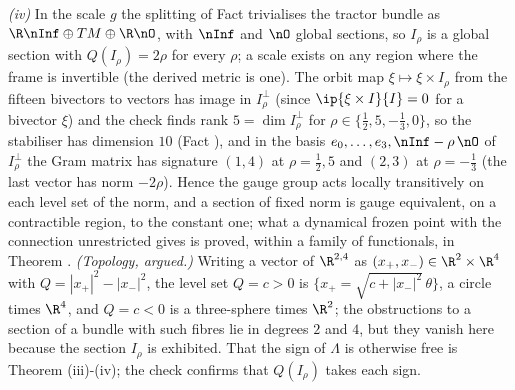 \emph{(iv)} In the scale $g$ the splitting of Fact  trivialises the tractor bundle as $\R\nInf \oplus TM \oplus \R\nO$, with $\nInf$ and $\nO$ global sections, so $I_{\rho}$ is a global section with $Q(I_{\rho}) = 2\rho$ for every $\rho$; a scale exists on any region where the frame is invertible (the derived metric is one). The orbit map $\xi \mapsto \xi \times I_{\rho}$ from the fifteen bivectors to vectors has image in $I_{\rho}^{\perp}$ (since $\ip{\xi \times I}{I} = 0$ for a bivector $\xi$) and the check finds rank $5 = \dim I_{\rho}^{\perp}$ for $\rho \in \{\tfrac12, 5, -\tfrac13, 0\}$, so the stabiliser has dimension $10$ (Fact ), and in the basis $e_{0}, \ldots, e_{3}, \nInf - \rho\,\nO$ of $I_{\rho}^{\perp}$ the Gram matrix has signature $(1,4)$ at $\rho = \tfrac12, 5$ and $(2,3)$ at $\rho = -\tfrac13$ (the last vector has norm $-2\rho$). Hence the gauge group acts locally transitively on each level set of the norm, and a section of fixed norm is gauge equivalent, on a contractible region, to the constant one; what a dynamical frozen point with the connection unrestricted gives is proved, within a family of functionals, in Theorem . \emph{(Topology, argued.)} Writing a vector of $\R^{2,4}$ as $(x_{+}, x_{-}) \in \R^{2} \times \R^{4}$ with $Q = |x_{+}|^{2} - |x_{-}|^{2}$, the level set $Q = c > 0$ is $\{x_{+} = \sqrt{c + |x_{-}|^{2}}\,\theta\}$, a circle times $\R^{4}$, and $Q = c < 0$ is a three-sphere times $\R^{2}$; the obstructions to a section of a bundle with such fibres lie in degrees $2$ and $4$, but they vanish here because the section $I_{\rho}$ is exhibited. That the sign of $\Lambda$ is otherwise free is Theorem (iii)-(iv); the check confirms that $Q(I_{\rho})$ takes each sign.

